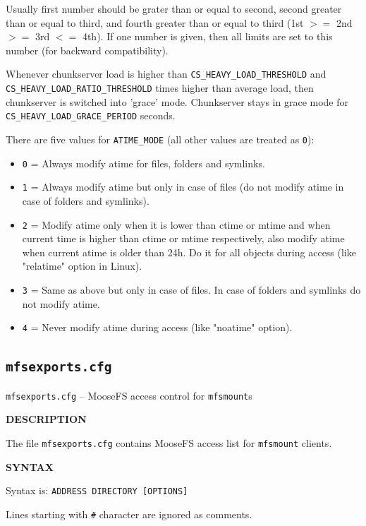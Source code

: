 \documentclass[a4paper,11pt,english]{report}
\def\code#1{\texttt{#1}}
\begin{document}
					Usually first number should be grater than or equal to second, second greater than or equal to third, and fourth greater than or equal to third (1st $>=$ 2nd $>=$ 3rd $<=$ 4th). If one number is given, then all limits are set to this  number (for backward compatibility).

					Whenever  chunkserver  load  is  higher  than  \code{CS\_HEAVY\_LOAD\_THRESHOLD}   and \\ \code{CS\_HEAVY\_LOAD\_RATIO\_THRESHOLD}  times  higher  than  average  load,  then  chunkserver  is  switched  into  'grace'  mode. Chunkserver stays in grace mode for \code{CS\_HEAVY\_LOAD\_GRACE\_PERIOD} seconds.

       				There are five values for \code{ATIME\_MODE} (all other values are treated as \code{0}):
					\begin{itemize}
						\item \code{0} = Always modify atime for files, folders and symlinks.
						\item \code{1} = Always modify atime but only in case of files (do not modify atime in case of folders and symlinks).
						\item \code{2} = Modify atime only when it is lower than ctime or mtime and when current time is higher than ctime or mtime respectively, also modify atime when current atime is older than 24h. Do it for all objects during access (like "relatime"
         option in Linux).
						\item \code{3} = Same as above but only in case of files. In case of folders and symlinks do not modify atime.
						\item \code{4} = Never modify atime during access (like "noatime" option).
					\end{itemize}
					
			\subsection{\code{mfsexports.cfg}}
				\code{mfsexports.cfg} -- MooseFS access control for \code{mfsmount}s				
				\bigskip
				
				\textbf{DESCRIPTION}
				
				The  file  \code{mfsexports.cfg}  contains  MooseFS  access  list for \code{mfsmount} clients.
				\bigskip
				
				\textbf{SYNTAX}
				
				Syntax is:
				\code{ADDRESS DIRECTORY [OPTIONS]}

				Lines starting with \code{\#} character are ignored as comments.
\end{document}
